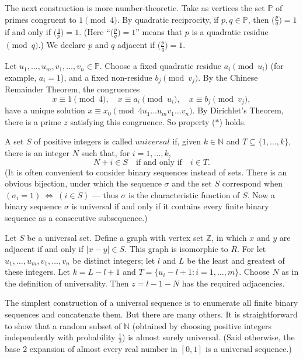 \documentclass{book}
\begin{document}
The next construction is more number-theoretic. Take as vertices the
set $\mathbb{P}$ of primes congruent to $1 \pmod{4}$. By quadratic
reciprocity, if $p,q \in\mathbb{P}$, then $\big(\frac{p}{q}\big) = 1$ if
and only if $\big(\frac{q}{p}\big) = 1$. (Here ``$\big(\frac{p}{q}\big) = 1$''
means that $p$ is a quadratic residue $\pmod{q}$.) We declare $p$ and $q$
adjacent if $\big(\frac{p}{q}\big)= 1$.

Let $u_1, \ldots, u_m, v_1, \ldots, v_n\in\mathbb{P}$. Choose a
fixed quadratic residue $a_i\pmod{u_i}$ (for example, $a_i = 1$),
and a fixed non-residue $b_j\pmod{v_j}$. By the Chinese Remainder
Theorem, the congruences
\[ 
x \equiv 1\pmod{4},\quad x \equiv a_i \pmod{u_i},\quad x \equiv b_j \pmod{v_j},
\]
have a unique solution $x \equiv x_0\pmod {4u_1 \ldots u_m v_1
\ldots  v_n}$. By Dirichlet's Theorem, there is a prime $z$
satisfying this congruence. So property ($\ast$) holds.

A set $S$ of positive integers is called $universal$ if, given
$k\in\mathbb{N}$ and $T \subseteq \{1,\ldots, k\}$, there is an
integer $N$ such that, for $i = 1, \ldots,k$,
\[
N+ i \in S\quad\mbox{if and only if}\quad i \in  T.
\]
(It is often convenient to consider binary sequences instead of
sets. There is an obvious bijection, under which the sequence
$\sigma$ and the set $S$ correspond when $(\sigma_i = 1)
~\Leftrightarrow~(i \in S)$ --- thus $\sigma$ is the characteristic
function of $S$. Now a binary sequence $\sigma$ is universal if and
only if it contains every finite binary sequence as a consecutive
subsequence.)

Let $S$ be a universal set. Define a graph with vertex set
$\mathbb{Z}$, in which $x$ and $y$ are adjacent if and only if 
$|x-y|\in S$. This graph is isomorphic to $R$. For let $u_1, \ldots,
u_m, v_1, \ldots, v_n$ be distinct integers; let $l$ and $L$ be the
least and greatest of these integers. Let $k = L - l + 1$ and $T =
\{u_i - l + 1 : i = 1, \ldots, m\}$. Choose $N$ as in the
definition of universality. Then $z = l - 1 - N$ has the required
adjacencies.

The simplest construction of a universal sequence is to enumerate
all finite binary sequences and concatenate them. But there are many
others. It is straight\-forward to show that a random subset of
$\mathbb{N}$ (obtained by choosing positive integers independently
with probability $\frac{1}{2}$) is almost surely universal. (Said
otherwise, the base $2$ expansion of almost every real number in 
$[0,1]$ is a universal sequence.)
\end{document}
